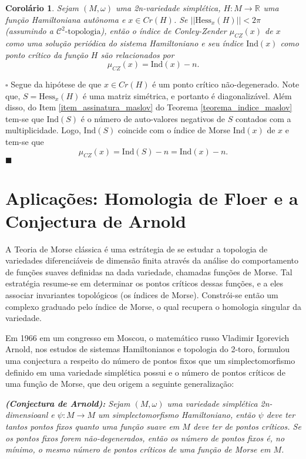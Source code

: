 \documentclass[12pt]{book}
\newtheorem{corolario}[teorema]{Corolário}
\newenvironment{prova}[1]{$\square$ #1}{\hfill$\blacksquare$}
\newcommand{\cktopologia}[1]{\mathcal{C}^{#1}\text{-topologia}}
\newcommand{\hessianaponto}[2]{\text{Hess}_{#1}(#2)}
\newcommand{\iconley}[1]{\iconleyabrev(#1)}
\newcommand{\iconleyabrev}{\mu_{CZ}}
\newcommand{\ind}{\text{Ind}}
\newcommand{\norma}[1]{||#1||}
\newcommand{\pontoscriticos}[1]{\textit{Cr}(#1)}
\newcommand{\real}[1]{\mathbb{R}^{#1}}
\newcommand{\reta}{\real{}}
\begin{document}
	
	\begin{corolario}
		Sejam $(M,\omega)$ uma 2n-variedade simplética, $H:M\to \reta$ uma função Hamiltoniana autônoma e $x \in \pontoscriticos{H}$. Se $\norma{\hessianaponto{x}{H}}<2\pi$ (assumindo a $\cktopologia{2}$), então o índice de Conley-Zender $\iconley{x}$ de $x$ como uma solução periódica do sistema Hamiltoniano e seu índice $\ind(x)$ como ponto crítico da função $H$ são relacionados por
		$$
		\iconley{x} = \ind(x)-n.
		$$
	\end{corolario}
	\begin{prova}
		Segue da hipótese de que $x\in \pontoscriticos{H}$ é um ponto crítico não-degenerado. Note que, $S=\hessianaponto{x}{H}$ é uma matriz simétrica, e portanto é diagonalizável. Além disso, do Item \ref{item_assinatura_maslov} do Teorema \ref{teorema_indice_maslov} tem-se que $\ind(S)$ é o número de auto-valores negativos de $S$ contados com a multiplicidade. Logo, $\ind(S)$ coincide com o índice de Morse $\ind(x)$ de $x$ e tem-se que
		$$
		\iconley{x} = \ind(S)-n = \ind(x)-n.
		$$
	\end{prova}
	
	\chapter{Aplicações: Homologia de Floer e a Conjectura de Arnold}\label{capitulo_homologia_floer}
	
	A Teoria de Morse clássica é uma estrátegia de se estudar a topologia de variedades diferenciáveis de dimensão finita através da análise do comportamento de funções suaves definidas na dada variedade, chamadas funções de Morse. Tal estratégia resume-se em determinar os pontos críticos dessas funções, e a eles associar invariantes topológicos (os índices de Morse). Constrói-se então um complexo graduado pelo índice de Morse, o qual recupera o homologia singular da variedade.
	
	Em 1966 em um congresso em Moscou, o matemático russo Vladimir Igorevich Arnold, nos estudos de sistemas Hamiltonianos e topologia do 2-toro, formulou uma conjectura a respeito do número de pontos fixos que um simplectomorfismo definido em uma variedade simplética possui e o número de pontos críticos de uma função de Morse, que deu origem a seguinte generalização:
	
	\textit{\textbf{(Conjectura de Arnold):} Sejam $(M, \omega)$ uma variedade simplética 2n-dimensioanl e $\psi : M \to M $ um simplectomorfismo Hamiltoniano, então $\psi$ deve ter tantos pontos fixos quanto uma função suave em $M$ deve ter de pontos críticos. Se os pontos fixos forem não-degenerados, então os número de pontos fixos é, no mínimo, o mesmo número de pontos críticos de uma função de Morse em $M$.}
	
\end{document}
